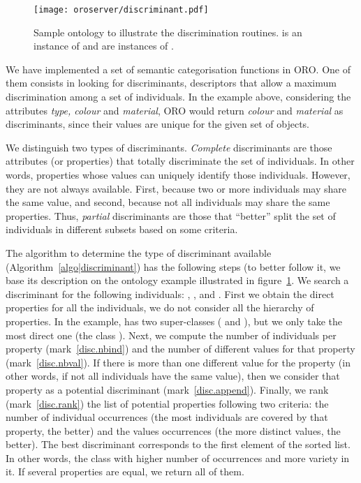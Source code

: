 \begin{figure}
    \centering
    \texttt{[image: oroserver/discriminant.pdf]}
    \caption{Sample ontology to illustrate the discrimination routines.
     is an instance of  and
     are instances of .}
    \label{fig|discriminant}
\end{figure}

We have implemented a set of semantic categorisation functions in ORO. One of
them consists in looking for discriminants, \ie descriptors that allow a
maximum discrimination among a set of individuals. In the example above,
considering the attributes \emph{type, colour} and \emph{material}, ORO would
return \emph{colour} and \emph{material} as discriminants, since their values
are unique for the given set of objects.

We distinguish two types of discriminants. \emph{Complete} discriminants are
those attributes (or properties) that totally discriminate the set of
individuals. In other words, properties whose values can uniquely identify
those individuals. However, they are not always available. First, because two
or more individuals may share the same value, and second, because not all
individuals may share the same properties. Thus, \emph{partial} discriminants
are those that ``better'' split the set of individuals in different subsets
based on some criteria.

The algorithm to determine the type of discriminant available
(Algorithm~\ref{algo|discriminant}) has the following steps (to better follow
it, we base its description on the ontology example illustrated in
figure~\ref{fig|discriminant}. We search a discriminant for the following
individuals: , ,  and
. First we obtain the direct properties for all the
individuals, \ie we do not consider all the hierarchy of properties. In the
example,  has two super-classes ( and
), but we only take the most direct one (the class
). Next, we compute the number of individuals per property
(mark~\ref{disc.nbind}) and the number of different values for that property
(mark~\ref{disc.nbval}). If there is more than one different value for the
property (in other words, if not all individuals have the same value), then we
consider that property as a potential discriminant (mark~\ref{disc.append}).
Finally, we rank (mark~\ref{disc.rank}) the list of potential properties
following two criteria: the number of individual occurrences (\ie the most
individuals are covered by that property, the better) and the values
occurrences (\ie the more distinct values, the better).  The best discriminant
corresponds to the first element of the sorted list. In other words, the class
with higher number of occurrences and more variety in it.  If several
properties are equal, we return all of them.


